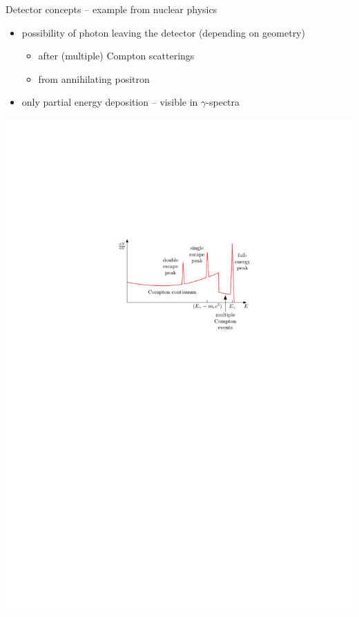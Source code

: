 \documentclass[11pt,xcolor=dvipsnames,professionalfonts]{beamer}
\begin{document}
\begin{frame}{Detector concepts -- example from nuclear physics}
	\begin{itemize}
		\setlength\itemsep{0.5em}
		\item possibility of photon leaving the detector (depending on geometry)
		
		\begin{itemize}
			\item after (multiple) Compton scatterings
			\item from annihilating positron
		\end{itemize}
		
		\item only partial energy deposition -- visible in $\gamma$-spectra
	\end{itemize}
	\begin{center}
		\vspace{0.5cm}
		\includegraphics{./figures/knoll/intermediate.pdf}
	\end{center}
\end{frame}
\end{document}
